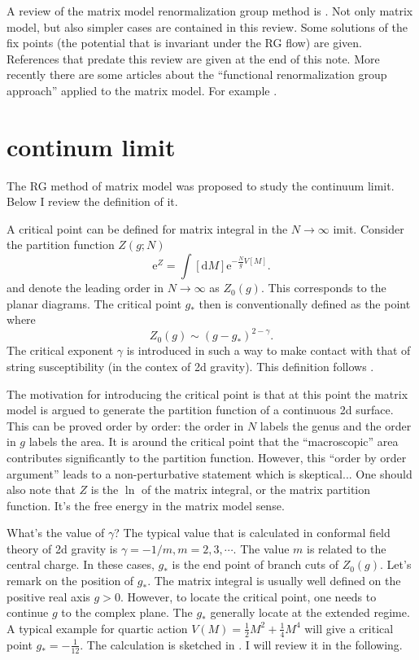 A review of the matrix model renormalization group method is
.
Not only matrix model, but also simpler cases are contained in this review.
Some solutions of the fix points (the potential that is invariant under the RG flow) are given.
References that predate this review are given at the end of this note.
More recently there are some articles about the ``functional renormalization group approach'' applied to the matrix model.
For example
.

\section{continum limit}
The RG method of matrix model was proposed to study the continuum limit.
Below I review the definition of it.

A critical point can be defined for matrix integral in the $N\to\infty$ imit. 
Consider the partition function $Z(g;N)$ 
\begin{equation}
	\mathrm{e}^{Z} = \int [\mathrm{d}M] \mathrm{e}^{-\frac{N}{g}V[M]}
.\end{equation}
and denote the leading order in $N\to\infty$ as $Z_0(g)$. 
This corresponds to the planar diagrams.
The critical point $g_*$ then is conventionally defined as the point where
\[
Z_0(g)\sim (g-g_*)^{2-\gamma}
.\]
The critical exponent $\gamma$ is introduced in such a way to make contact with that of string susceptibility (in the contex of 2d gravity).
This definition follows
.

The motivation for introducing the critical point is that
at this point the matrix model is argued to generate the partition function of a continuous 2d surface.
This can be proved order by order:
the order in $N$ labels the genus and the order in $g$ labels the area.
It is around the critical point that the ``macroscopic'' area contributes significantly to the partition function.
However, this ``order by order argument'' leads to a non-perturbative statement which is skeptical...
One should also note that $Z$ is the $\ln$ of the matrix integral, or the matrix partition function.
It's the free energy in the matrix model sense.

What's the value of $\gamma$? The typical value that is calculated in conformal field theory of 2d gravity is $\gamma = -1 / m, m=2,3,\cdots$.
The value $m$ is related to the central charge.
In these cases, $g_*$ is the end point of branch cuts of $Z_0(g)$.
Let's remark on the position of $g_*$.
The matrix integral is usually well defined on the positive real axis $g>0$.
However, to locate the critical point,
one needs to continue $g$ to the complex plane.
The $g_*$ generally locate at the extended regime.
A typical example for quartic action $V(M)=\frac{1}{2}M^2 + \frac{1}{4}M^4$ will give a critical point $g_*=-\frac{1}{12}$.
The calculation is sketched in
.
I will review it in the following.

